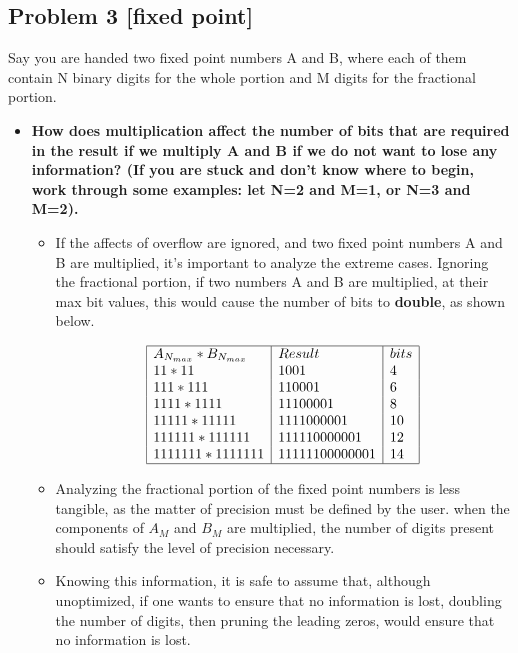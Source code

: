 \documentclass[11pt]{article}
\begin{document}
\subsection*{Problem 3 [fixed point]}
Say you are handed two fixed point numbers A and B, where each of them contain N binary digits for the whole portion and M digits for the fractional portion. 

\begin{itemize}
	\item \textbf{How does multiplication affect the number of bits that are required in the result if we multiply A and B if we do not want to lose any information? (If you are stuck and don't know where to begin, work through some examples: let N=2 and M=1, or N=3 and M=2).}
		\begin{itemize}
			\item If the affects of overflow are ignored, and two fixed point numbers A and B are multiplied, it's important to analyze the extreme cases. Ignoring the fractional portion, if two numbers A and B are multiplied, at their max bit values, this would cause the number of bits to \textbf{double}, as shown below. 

			\begin{align*}
				\begin{array}{ | l | l | l | } \hline
					A_{N_{max}} * B_{N_{max}} & Result & bits \\
					11*11 & 1001 & 4 \\
					111*111 & 110001 & 6 \\
					1111*1111 & 11100001 & 8 \\
					11111*11111 & 1111000001 & 10 \\
					111111*111111 & 111110000001 & 12 \\
					1111111*1111111 & 11111100000001 & 14 \\ \hline
				\end{array}
			\end{align*}

			\item Analyzing the fractional portion of the fixed point numbers is less tangible, as the matter of precision must be defined by the user. when the components of $A_M$ and $B_M$ are multiplied, the number of digits present should satisfy the level of precision necessary. 
			\item Knowing this information, it is safe to assume that, although unoptimized, if one wants to ensure that no information is lost, doubling the number of digits, then pruning the leading zeros, would ensure that no information is lost. 
		\end{itemize}
\end{itemize}
\end{document}
